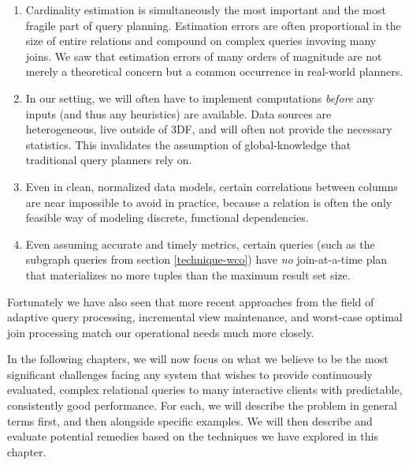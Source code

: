 \documentclass[../index.tex]{subfiles}
\begin{document}
\begin{enumerate}
  \item
    Cardinality estimation is simultaneously the most important and
    the most fragile part of query planning. Estimation errors are
    often proportional in the size of entire relations and compound on
    complex queries invoving many joins. We saw that estimation errors
    of many orders of magnitude are not merely a theoretical concern
    but a common occurrence in real-world planners.

  \item
    In our setting, we will often have to implement computations
    \emph{before} any inputs (and thus any heuristics) are
    available. Data sources are heterogeneous, live outside of 3DF,
    and will often not provide the necessary statistics. This
    invalidates the assumption of global-knowledge that traditional
    query planners rely on.

  \item
    Even in clean, normalized data models, certain correlations
    between columns are near impossible to avoid in practice, because
    a relation is often the only feasible way of modeling discrete,
    functional dependencies.

  \item
    Even assuming accurate and timely metrics, certain queries (such
    as the subgraph queries from section \ref{technique-wco}) have
    \emph{no} join-at-a-time plan that materializes no more tuples
    than the maximum result set size.
\end{enumerate}

Fortunately we have also seen that more recent approaches from the
field of adaptive query processing, incremental view maintenance, and
worst-case optimal join processing match our operational needs much
more closely.

In the following chapters, we will now focus on what we believe to be
the most significant challenges facing any system that wishes to
provide continuously evaluated, complex relational queries to many
interactive clients with predictable, consistently good
performance. For each, we will describe the problem in general terms
first, and then alongside specific examples. We will then describe and
evaluate potential remedies based on the techniques we have explored
in this chapter.
\end{document}
